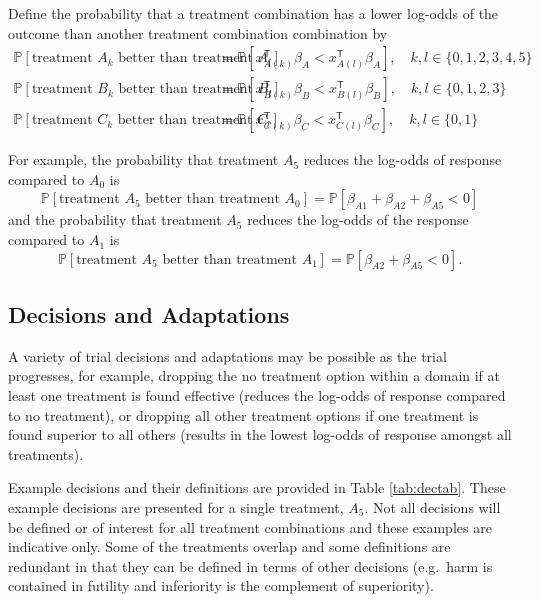 \documentclass[
]{article}
\begin{document}
Define the probability that a treatment combination has a lower log-odds of the outcome than another treatment combination combination by
\[
\begin{aligned}
\mathbb P[\text{treatment }A_k\text{ better than treatment } A_l] &=\mathbb P\left[x_{A(k)}^{\mathsf{T}}\beta_A < x_{A(l)}^{\mathsf{T}}\beta_A\right],\quad k,l\in\{0,1,2,3,4,5\} \\
\mathbb P[\text{treatment }B_k\text{ better than treatment } B_l] &=\mathbb P\left[x_{B(k)}^{\mathsf{T}}\beta_B < x_{B(l)}^{\mathsf{T}}\beta_B\right],\quad k,l\in\{0,1,2,3\} \\
\mathbb P[\text{treatment }C_k\text{ better than treatment } C_l] &=\mathbb P\left[x_{C(k)}^{\mathsf{T}}\beta_C < x_{C(l)}^{\mathsf{T}}\beta_C\right],\quad k,l\in\{0,1\}
\end{aligned}
\]

For example, the probability that treatment \(A_5\) reduces the log-odds of response compared to \(A_0\) is
\[
\mathbb P[\text{treatment } A_5\text{ better than treatment } A_0] = \mathbb P[\beta_{A1}+\beta_{A2}+\beta_{A5}<0]
\]
and the probability that treatment \(A_5\) reduces the log-odds of the response compared to \(A_1\) is
\[
\mathbb P[\text{treatment } A_5\text{ better than treatment } A_1] = \mathbb P[\beta_{A2}+\beta_{A5}<0].
\]

\hypertarget{decisions-and-adaptations}{%
\subsection{Decisions and Adaptations}\label{decisions-and-adaptations}}

A variety of trial decisions and adaptations may be possible as the trial progresses, for example, dropping the no treatment option within a domain if at least one treatment is found effective (reduces the log-odds of response compared to no treatment), or dropping all other treatment options if one treatment is found superior to all others (results in the lowest log-odds of response amongst all treatments).

Example decisions and their definitions are provided in Table \ref{tab:dectab}.
These example decisions are presented for a single treatment, \(A_5\).
Not all decisions will be defined or of interest for all treatment combinations and these examples are indicative only.
Some of the treatments overlap and some definitions are redundant in that they can be defined in terms of other decisions (e.g.~harm is contained in futility and inferiority is the complement of superiority).
\end{document}
